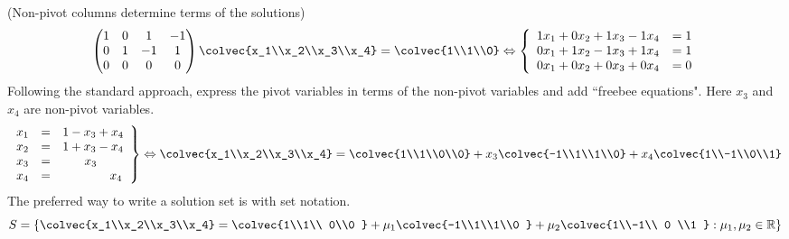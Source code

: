 \begin{example} (Non-pivot columns determine terms of the solutions)
$$\begin{pmatrix}
1 &  0 & 1 & -1 \\ 
 0 & 1 & -1& 1  \\
 0 &0   & 0  & 0 \\
\end{pmatrix}
\colvec{x_1\\x_2\\x_3\\x_4} 
=
\colvec{1\\1\\0} 
\Leftrightarrow
\left\{
\begin{array}{lcr}
	1x_1 +0x_2+ 1x_3 - 1x_4 & = 1 \\
	0x_1 +1x_2 - 1x_3 + 1x_4 & = 1 \\
	0x_1 +0x_2 + 0x_3 + 0x_4 & = 0 
\end{array}
     \right.
$$
Following the standard approach, express the pivot variables in terms of the non-pivot variables and add ``freebee equations". Here $x_3$ and $x_4$ are non-pivot variables.  
\begin{eqnarray*}
\left.
\begin{array}{rcl}
	x_1 & = &1 -x_3+x_4 \\
	x_2 & = &1 +x_3-x_4 \\
	x_3 & = &\phantom{1+~\,}x_3\\
	x_4 & =&\phantom{1+x_3+~}x_4         
\end{array}
     \right\}
     \Leftrightarrow
\colvec{x_1\\x_2\\x_3\\x_4} 
= \colvec{1\\1\\0\\0} + x_3\colvec{-1\\1\\1\\0} + x_4\colvec{1\\-1\\0\\1}
\end{eqnarray*}
The preferred way to write a solution set is with set notation.  \[S = \left\{\colvec{x_1\\x_2\\x_3\\x_4} = \colvec{1\\1\\ 0\\0 } + \mu_1 \colvec{-1\\1\\1\\0 }  + \mu_2  \colvec{1\\-1\\ 0 \\1 } : \mu_1,\mu_2\in  {\mathbb R} \right\} \]

\end{example}

